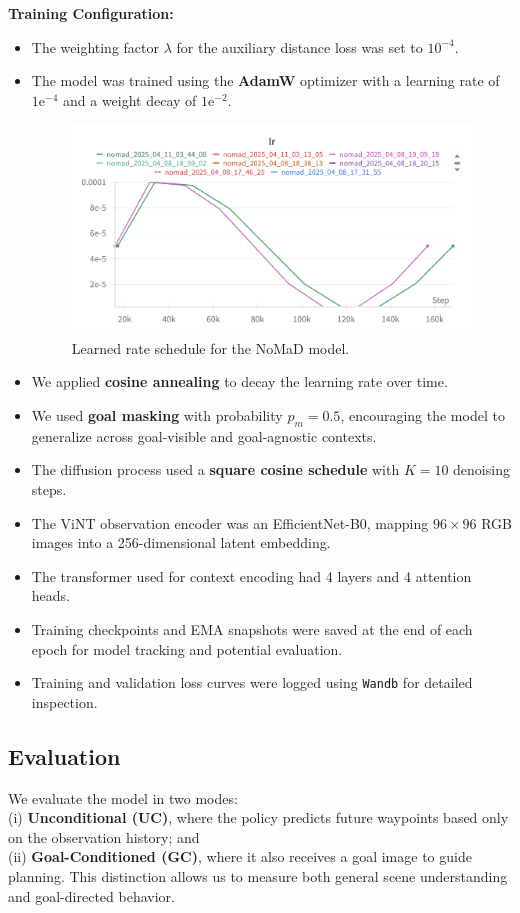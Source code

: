 \documentclass[12pt]{article}
\begin{document}
 \textbf{Training Configuration:}
 \begin{itemize}
     \item The weighting factor $\lambda$ for the auxiliary distance loss was set to $10^{-4}$.
     \item The model was trained using the \textbf{AdamW} optimizer with a learning rate of $1\text{e}^{-4}$ and a weight decay of $1\text{e}^{-2}$.
        \begin{figure}[H]
            \centering
            \includegraphics[width=1\textwidth]{images/lr.png}
            \caption{Learned rate schedule for the NoMaD model.}
            \label{fig:lr}
        \end{figure}
     \item We applied \textbf{cosine annealing} to decay the learning rate over time.
     \item We used \textbf{goal masking} with probability $p_m = 0.5$, encouraging the model to generalize across goal-visible and goal-agnostic contexts.
     \item The diffusion process used a \textbf{square cosine schedule} with $K = 10$ denoising steps.
     \item The ViNT observation encoder was an EfficientNet-B0, mapping $96 \times 96$ RGB images into a 256-dimensional latent embedding.
     \item The transformer used for context encoding had 4 layers and 4 attention heads.
     \item Training checkpoints and EMA snapshots were saved at the end of each epoch for model tracking and potential evaluation.
     \item Training and validation loss curves were logged using \texttt{Wandb} for detailed inspection.
\end{itemize}
\subsection{Evaluation}
We evaluate the model in two modes:\\ 
(i) \textbf{Unconditional (UC)}, where the policy predicts future waypoints based only on the observation history; and \\
(ii) \textbf{Goal-Conditioned (GC)}, where it also receives a goal image to guide planning. This distinction allows us to measure both general scene understanding and goal-directed behavior.
\end{document}
